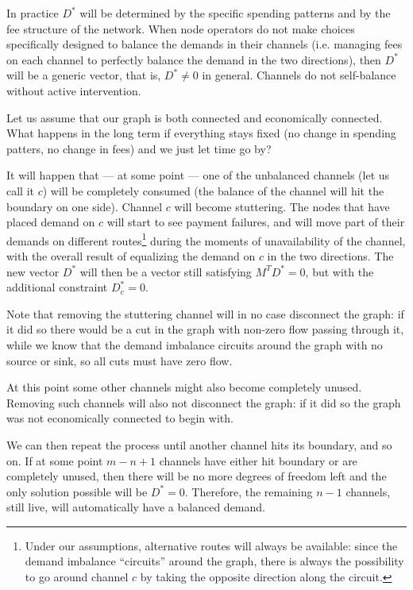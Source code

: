 \documentclass[a4paper]{article}
\begin{document}
In practice $D^*$ will be determined by the specific spending patterns and by the fee structure of the network. When node operators do not make choices specifically designed to balance the demands in their channels (i.e. managing fees on each channel to perfectly balance the demand in the two directions), then $D^*$ will be a generic vector, that is, $D^* \neq 0$ in general. Channels do not self-balance without active intervention.

Let us assume that our graph is both connected and economically connected. What happens in the long term if everything stays fixed (no change in spending patters, no change in fees) and we just let time go by?

It will happen that --- at some point --- one of the unbalanced channels (let us call it $c$) will be completely consumed (the balance of the channel will hit the boundary on one side). Channel $c$ will become stuttering. The nodes that have placed demand on $c$ will start to see payment failures, and will move part of their demands on different routes\footnote{Under our assumptions, alternative routes will always be available: since the demand imbalance ``circuits'' around the graph, there is always the possibility to go around channel $c$ by taking the opposite direction along the circuit.} during the moments of unavailability of the channel, with the overall result of equalizing the demand on $c$ in the two directions. The new vector $D^*$ will then be a vector still satisfying $M^T D^* = 0$, but with the additional constraint $D^*_c = 0$.

Note that removing the stuttering channel will in no case disconnect the graph: if it did so there would be a cut in the graph with non-zero flow passing through it, while we know that the demand imbalance circuits around the graph with no source or sink, so all cuts must have zero flow.

At this point some other channels might also become completely unused. Removing such channels will also not disconnect the graph: if it did so the graph was not economically connected to begin with.

We can then repeat the process until another channel hits its boundary, and so on. If at some point $m-n+1$ channels have either hit boundary or are completely unused, then there will be no more degrees of freedom left and the only solution possible will be $D^* = 0$. Therefore, the remaining $n-1$ channels, still live, will automatically have a balanced demand.
\end{document}
